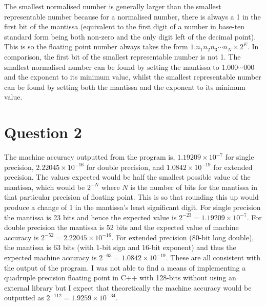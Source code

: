 \documentclass{article}
\begin{document}
The smallest normalised number is generally larger than the smallest representable number because for a normalised number, there is always a 1 in the first bit of the mantissa (equivalent to the first digit of a number in base-ten standard form being both non-zero and the only digit left of the decimal point). This is so the floating point number always takes the form $1.n_1n_2n_3\cdots{n_N}\times2^{E}$. In comparison, the first bit of the smallest representable number is not 1. The smallest normalised number can be found by setting the mantissa to $1.000\cdots{000}$ and the exponent to its minimum value, whilst the smallest representable number can be found by setting both the mantissa and the exponent to its minimum value. 

\section{Question 2}

The machine accuracy outputted from the program is, $1.19209\times{10^{-7}}$ for single precision,  $2.22045\times{10^{-16}}$ for double precision, and $1.0842\times{10^{-19}}$ for extended precision. The values expected would be half the smallest possible value of the mantissa, which would be $2^{-N}$ where $N$ is the number of bits for the mantissa in that particular precision of floating point. This is so that rounding this up would produce a change of 1 in the mantissa’s least significant digit. For single precision the mantissa is 23 bits and hence the expected value is $2^{-23}=1.19209\times{10^{-7}}$. For double precision the mantissa is 52 bits and the expected value of machine accuracy is $2^{-52}=2.22045\times{10^{-16}}$. For extended precision (80-bit long double), the mantissa is 63 bits (with 1-bit sign and 16-bit exponent) and thus the expected machine accuracy is  $2^{-63}=1.0842\times{10^{-19}}$. These are all consistent with the output of the program. I was not able to find a means of implementing a quadruple precision floating point in C++ with 128-bits without using an external library but I expect that theoretically the machine accuracy would be outputted as $2^{-112}=1.9259\times{10^{-34}}$.
\end{document}

